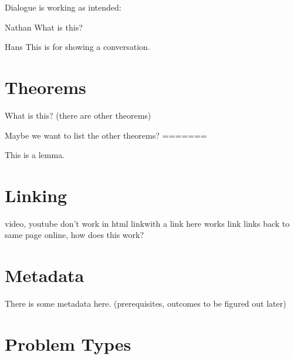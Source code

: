 \documentclass{ximera}
\begin{document}
Dialogue is working as intended:

\begin{dialogue}
\item[Nathan] What is this?
\item[Hans] This is for showing a conversation.
\end{dialogue}

\section{Theorems}

\begin{theorem}
What is this? (there are other theorems)
\end{theorem}

Maybe we want to list the other theorems?
=======
\begin{lemma}
This is a lemma.
\end{lemma}



\section{Linking}

video, youtube don't work in html
link{with a link here} works
link{} links back to same page online, how does this work?

\link{} %



\section{Metadata}

There is some metadata here. (prerequisites, outcomes to be figured out later)





\section{Problem Types}
\end{document}
